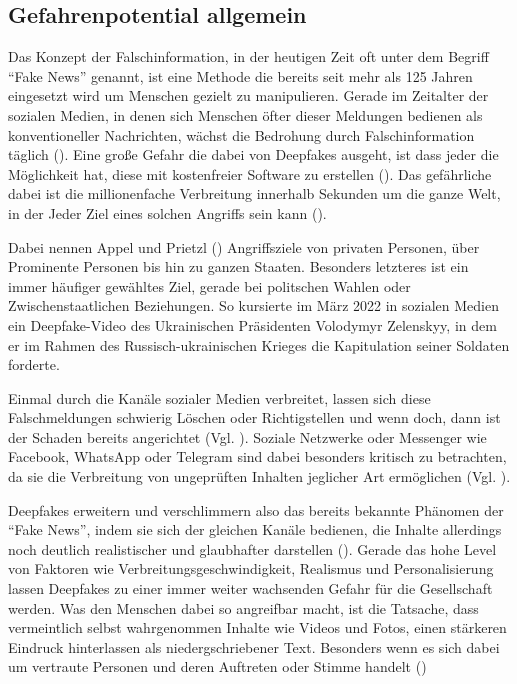 \subsection{Gefahrenpotential allgemein}\label{Gefahrenpotential}
Das Konzept der Falschinformation, in der heutigen Zeit oft unter dem Begriff ``Fake News'' genannt, ist eine Methode die bereits seit mehr als 125 Jahren eingesetzt wird um Menschen gezielt zu manipulieren.
Gerade im Zeitalter der sozialen Medien, in denen sich Menschen öfter dieser Meldungen bedienen als konventioneller Nachrichten, wächst die Bedrohung durch Falschinformation täglich (\cite{Lee2019}).
Eine große Gefahr die dabei von Deepfakes ausgeht, ist dass jeder die Möglichkeit hat, diese mit kostenfreier Software zu erstellen (\cite{Appel2022}).
Das gefährliche dabei ist die millionenfache Verbreitung innerhalb Sekunden um die ganze Welt, in der Jeder Ziel eines solchen Angriffs sein kann (\cite{Shahzad2022}).
\par
Dabei nennen Appel und Prietzl (\cite{Appel2022}) Angriffsziele von privaten Personen, über Prominente Personen bis hin zu ganzen Staaten.
Besonders letzteres ist ein immer häufiger gewähltes Ziel, gerade bei politschen Wahlen oder Zwischenstaatlichen Beziehungen.
So kursierte im März 2022 in sozialen Medien ein Deepfake-Video des Ukrainischen Präsidenten Volodymyr Zelenskyy, in dem er im Rahmen des Russisch-ukrainischen Krieges die Kapitulation seiner Soldaten forderte.
\par
Einmal durch die Kanäle sozialer Medien verbreitet, lassen sich diese Falschmeldungen schwierig Löschen oder Richtigstellen und wenn doch, dann ist der Schaden bereits angerichtet (Vgl. \cite{Shahzad2022}).
Soziale Netzwerke oder Messenger wie Facebook, WhatsApp oder Telegram sind dabei besonders kritisch zu betrachten, da sie die Verbreitung von ungeprüften Inhalten jeglicher Art ermöglichen (Vgl. \cite{Appel2022}).
\par
Deepfakes erweitern und verschlimmern also das bereits bekannte Phänomen der ``Fake News'', indem sie sich der gleichen Kanäle bedienen, die Inhalte allerdings noch deutlich realistischer und glaubhafter darstellen (\cite{Appel2022}).
Gerade das hohe Level von Faktoren wie Verbreitungsgeschwindigkeit, Realismus und Personalisierung lassen Deepfakes zu einer immer weiter wachsenden Gefahr für die Gesellschaft werden.
Was den Menschen dabei so angreifbar macht, ist die Tatsache, dass vermeintlich selbst wahrgenommen Inhalte wie Videos und Fotos, einen stärkeren Eindruck hinterlassen als niedergschriebener Text.
Besonders wenn es sich dabei um vertraute Personen und deren Auftreten oder Stimme handelt (\cite{Kietzmann2020})
\newpage